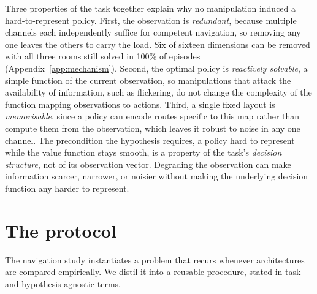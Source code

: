 \documentclass{article}
\begin{document}
Three properties of the task together explain why no manipulation induced a hard-to-represent
policy. First, the observation is \emph{redundant}, because multiple channels each
independently suffice for competent navigation, so removing any one leaves the others to carry
the load. Six of sixteen dimensions can be removed with all three rooms still solved in 100\%
of episodes (Appendix~\ref{app:mechanism}). Second, the optimal policy is \emph{reactively
solvable}, a simple function of the current observation, so manipulations that attack the
availability of information, such as flickering, do not change the complexity of the function
mapping observations to actions. Third, a single fixed layout is \emph{memorisable}, since a
policy can encode routes specific to this map rather than compute them from the observation,
which leaves it robust to noise in any one channel. The precondition the hypothesis requires,
a policy hard to represent while the value function stays smooth, is a property of the task's
\emph{decision structure}, not of its observation vector. Degrading the observation can make
information scarcer, narrower, or noisier without making the underlying decision function any
harder to represent.

\section{The protocol}
\label{sec:protocol}

The navigation study instantiates a problem that recurs whenever architectures are compared
empirically. We distil it into a reusable procedure, stated in task- and hypothesis-agnostic
terms.
\end{document}
